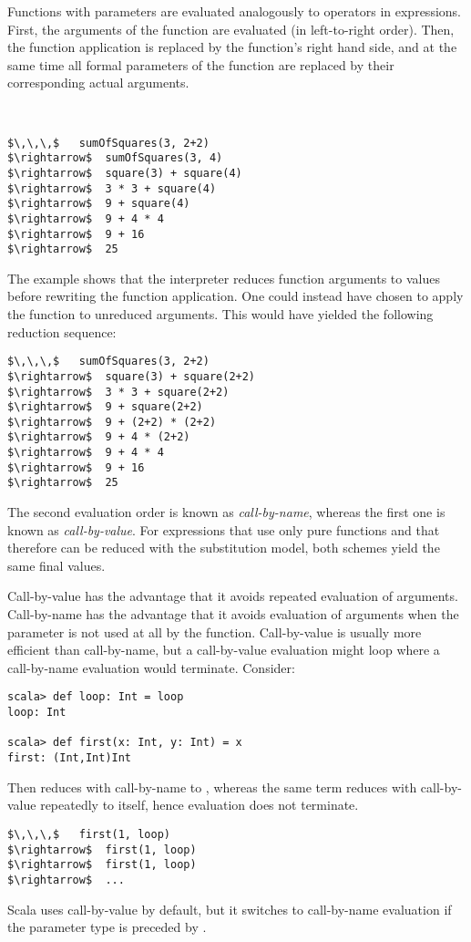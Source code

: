 Functions with parameters are evaluated analogously to operators in
expressions. First, the arguments of the function are evaluated (in
left-to-right order). Then, the function application is replaced by
the function's right hand side, and at the same time all formal
parameters of the function are replaced by their corresponding actual
arguments.

\example\ 
 
\begin{lstlisting}
$\,\,\,$   sumOfSquares(3, 2+2)
$\rightarrow$  sumOfSquares(3, 4)
$\rightarrow$  square(3) + square(4)
$\rightarrow$  3 * 3 + square(4)
$\rightarrow$  9 + square(4)
$\rightarrow$  9 + 4 * 4
$\rightarrow$  9 + 16
$\rightarrow$  25
\end{lstlisting}

The example shows that the interpreter reduces function arguments to
values before rewriting the function application.  One could instead
have chosen to apply the function to unreduced arguments. This would
have yielded the following reduction sequence:
\begin{lstlisting}
$\,\,\,$   sumOfSquares(3, 2+2)
$\rightarrow$  square(3) + square(2+2)
$\rightarrow$  3 * 3 + square(2+2)
$\rightarrow$  9 + square(2+2)
$\rightarrow$  9 + (2+2) * (2+2)
$\rightarrow$  9 + 4 * (2+2)
$\rightarrow$  9 + 4 * 4
$\rightarrow$  9 + 16
$\rightarrow$  25
\end{lstlisting}

The second evaluation order is known as \emph{call-by-name},
whereas the first one is known as \emph{call-by-value}.  For
expressions that use only pure functions and that therefore can be
reduced with the substitution model, both schemes yield the same final
values.  

Call-by-value has the advantage that it avoids repeated evaluation of
arguments. Call-by-name has the advantage that it avoids evaluation of
arguments when the parameter is not used at all by the function.
Call-by-value is usually more efficient than call-by-name, but a
call-by-value evaluation might loop where a call-by-name evaluation
would terminate. Consider:
\begin{lstlisting}
scala> def loop: Int = loop
loop: Int

scala> def first(x: Int, y: Int) = x
first: (Int,Int)Int
\end{lstlisting}
Then  reduces with call-by-name to ,
whereas the same term reduces with call-by-value repeatedly to itself,
hence evaluation does not terminate.
\begin{lstlisting}
$\,\,\,$   first(1, loop)
$\rightarrow$  first(1, loop)
$\rightarrow$  first(1, loop)
$\rightarrow$  ...
\end{lstlisting}
Scala uses call-by-value by default, but it switches to call-by-name evaluation
if the parameter type is preceded by \code{=>}.

